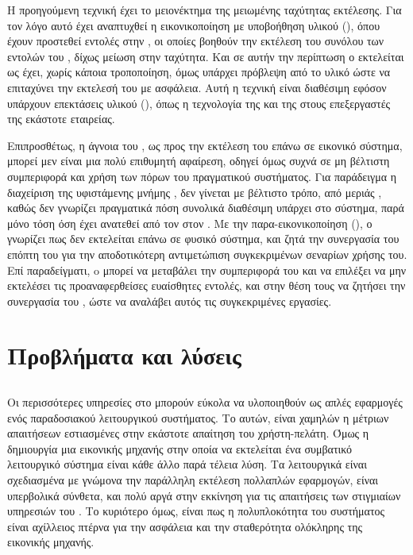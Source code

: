 H προηγούμενη τεχνική έχει το μειονέκτημα της μειωμένης ταχύτητας εκτέλεσης.
Για τον λόγο αυτό έχει αναπτυχθεί η εικονικοποίηση με υποβοήθηση υλικού
(), όπου έχουν προστεθεί εντολές στην ,
οι οποίες βοηθούν την εκτέλεση του συνόλου των εντολών του , δίχως
μείωση  στην ταχύτητα. Και σε αυτήν την περίπτωση ο  εκτελείται ως
έχει, χωρίς κάποια τροποποίηση, όμως υπάρχει πρόβλεψη από το υλικό ώστε να
επιταχύνει την εκτελεσή του με ασφάλεια\cite{VMwarePaper}. Αυτή η τεχνική είναι διαθέσιμη
εφόσον υπάρχουν επεκτάσεις υλικού (), όπως η
τεχνολογία  της  και  της  στους επεξεργαστές της εκάστοτε εταιρείας\cite{wikipediaX86}.
\newline

Επιπροσθέτως, η άγνοια του , ως προς την εκτέλεση του επάνω σε εικονικό
σύστημα, μπορεί μεν είναι μια πολύ επιθυμητή αφαίρεση, οδηγεί όμως συχνά σε
μη βέλτιστη συμπεριφορά και χρήση των πόρων του πραγματικού συστήματος. Για
παράδειγμα η διαχείριση της υφιστάμενης μνήμης , δεν γίνεται με βέλτιστο
τρόπο, από μεριάς , καθώς δεν γνωρίζει πραγματικά πόση συνολικά διαθέσιμη
υπάρχει στο σύστημα, παρά μόνο τόση όση έχει ανατεθεί από τον  στον
.  Με την παρα-εικονικοποίηση (), ο  γνωρίζει
πως δεν εκτελείται επάνω σε φυσικό σύστημα, και ζητά την συνεργασία του
επόπτη του για την αποδοτικότερη αντιμετώπιση συγκεκριμένων σεναρίων χρήσης
του. Επί παραδείγματι, o  μπορεί να μεταβάλει την συμπεριφορά του και
να επιλέξει να μην εκτελέσει τις προαναφερθείσες ευαίσθητες εντολές, και
στην θέση τους να ζητήσει την συνεργασία του , ώστε να αναλάβει αυτός
τις συγκεκριμένες εργασίες\cite{VMwarePaper}.

\section{Προβλήματα και λύσεις}

\subsection{}

Οι περισσότερες υπηρεσίες στο  μπορούν εύκολα να υλοποιηθούν
ως απλές εφαρμογές ενός παραδοσιακού λειτουργικού συστήματος. Το 
αυτών, είναι χαμηλών η μέτριων απαιτήσεων εστιασμένες στην εκάστοτε απαίτηση
του χρήστη-πελάτη. Όμως η δημιουργία μια εικονικής μηχανής στην οποία να
εκτελείται ένα συμβατικό λειτουργικό σύστημα είναι κάθε άλλο παρά τέλεια
λύση. Τα λειτουργικά είναι σχεδιασμένα με γνώμονα την παράλληλη εκτέλεση
πολλαπλών εφαρμογών, είναι υπερβολικά σύνθετα, και πολύ αργά στην εκκίνηση
για τις απαιτήσεις των στιγμιαίων υπηρεσιών του . Το κυριότερο
όμως, είναι πως η πολυπλοκότητα του συστήματος είναι αχίλλειος πτέρνα
για την ασφάλεια και την σταθερότητα ολόκληρης της εικονικής μηχανής.
\newline

